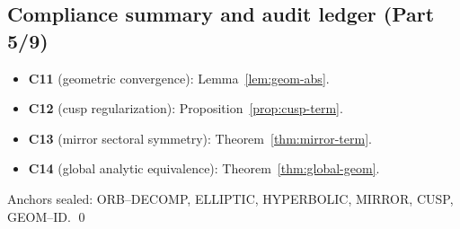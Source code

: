 
\subsection{Compliance summary and audit ledger (Part 5/9)}
\label{subsec:ch6-part5-compliance} \relax \hspace{0pt}
\begin{remark}
\label{rem:part5-compliance}
\begin{itemize}[leftmargin=7mm]
\item \textbf{C11} (geometric convergence): Lemma~\ref{lem:geom-abs}.
\item \textbf{C12} (cusp regularization): Proposition~\ref{prop:cusp-term}.
\item \textbf{C13} (mirror sectoral symmetry): Theorem~\ref{thm:mirror-term}.
\item \textbf{C14} (global analytic equivalence): Theorem~\ref{thm:global-geom}.
\end{itemize}
Anchors sealed:
\textsf{ORB–DECOMP},
\textsf{ELLIPTIC},
\textsf{HYPERBOLIC},
\textsf{MIRROR},
\textsf{CUSP},
\textsf{GEOM–ID}.
\qed {} %
\end{remark}



